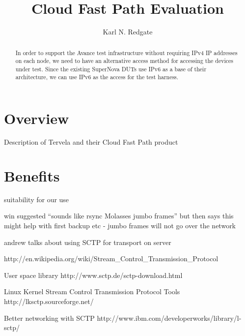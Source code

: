 \documentclass[twoside]{article}
\title{Cloud Fast Path Evaluation}
\author{Karl N. Redgate}
\begin{document}
\maketitle

\begin{abstract}

In order to support the Avance test infrastructure without requiring
IPv4 IP addresses on each node, we need to have an alternative access
method for accessing the devices under test.
Since the existing SuperNova DUTs use IPv6 as a base of their
architecture, we can use IPv6 as the access for the test harness.
\end{abstract}


\section{Overview}

Description of Tervela and their Cloud Fast Path product


\section{Benefits}

suitability for our use

win suggested ``sounds like rsync \+ Molasses \+ jumbo frames''
but then says this might help with first backup etc - jumbo frames will not go over the network

andrew talks about using SCTP for transport on server

http://en.wikipedia.org/wiki/Stream_Control_Transmission_Protocol

User space library
http://www.sctp.de/sctp-download.html

Linux Kernel Stream Control Transmission Protocol Tools
http://lksctp.sourceforge.net/

Better networking with SCTP
http://www.ibm.com/developerworks/library/l-sctp/
\end{document}
